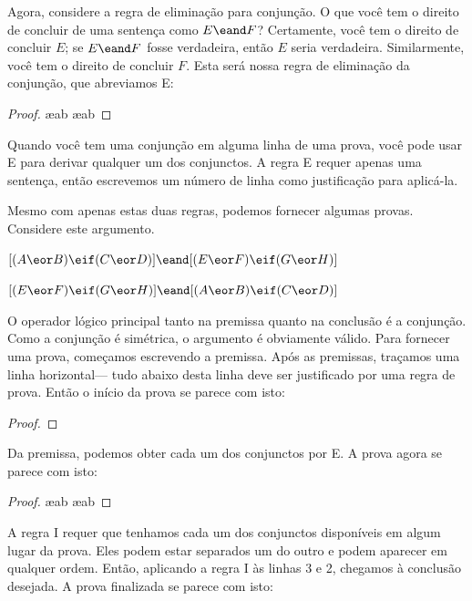 Agora, considere a regra de eliminação para conjunção. O que você tem o direito de concluir de uma sentença como $E \eand F$? Certamente, você tem o direito de concluir $E$; se $E \eand F$ fosse verdadeira, então $E$ seria verdadeira. Similarmente, você tem o direito de concluir $F$. Esta será nossa regra de eliminação da conjunção, que abreviamos {\eand}E:

\begin{proof}
	 \ae{ab}
	 \ae{ab}
\end{proof}

Quando você tem uma conjunção em alguma linha de uma prova, você pode usar {\eand}E para derivar qualquer um dos conjunctos. A regra {\eand}E requer apenas uma sentença, então escrevemos um número de linha como justificação para aplicá-la.

Mesmo com apenas estas duas regras, podemos fornecer algumas provas. Considere este argumento.
\begin{earg}
\item[] $[(A\eor B)\eif(C\eor D)] \eand [(E \eor F) \eif (G\eor H)]$
\item[\therefore] $[(E \eor F) \eif (G\eor H)] \eand [(A\eor B)\eif(C\eor D)]$
\end{earg}
O operador lógico principal tanto na premissa quanto na conclusão é a conjunção. Como a conjunção é simétrica, o argumento é obviamente válido. Para fornecer uma prova, começamos escrevendo a premissa. Após as premissas, traçamos uma linha horizontal--- tudo abaixo desta linha deve ser justificado por uma regra de prova. Então o início da prova se parece com isto:

\begin{proof}
\end{proof}

Da premissa, podemos obter cada um dos conjunctos por {\eand}E. A prova agora se parece com isto:

\begin{proof}
	 \ae{ab}
	 \ae{ab}
\end{proof}

A regra {\eand}I requer que tenhamos cada um dos conjunctos disponíveis em algum lugar da prova. Eles podem estar separados um do outro e podem aparecer em qualquer ordem. Então, aplicando a regra {\eand}I às linhas 3 e 2, chegamos à conclusão desejada. A prova finalizada se parece com isto:


